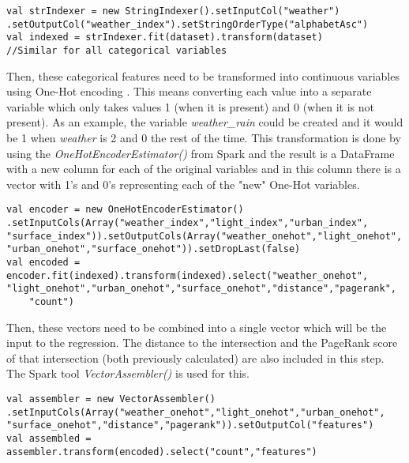 \begin{lstlisting}[style=myScalastyle]
val strIndexer = new StringIndexer().setInputCol("weather") .setOutputCol("weather_index").setStringOrderType("alphabetAsc") 
val indexed = strIndexer.fit(dataset).transform(dataset)
//Similar for all categorical variables
\end{lstlisting}
Then, these categorical features need to be transformed into continuous variables using One-Hot encoding \cite{onehot}. This means converting each value into a separate variable which only takes values 1 (when it is present) and 0 (when it is not present).
As an example, the variable \textit{weather\_rain} could be created and it would be 1 when \textit{weather} is 2 and 0 the rest of the time. This transformation is done by using the \textit{OneHotEncoderEstimator()} from Spark \cite{sparktransform} and the result is a DataFrame with a new column for each of the original variables and in this column there is a vector with 1's and 0's representing each of the "new" One-Hot variables.\\
\begin{lstlisting}[style=myScalastyle]
val encoder = new OneHotEncoderEstimator() .setInputCols(Array("weather_index","light_index","urban_index", "surface_index")).setOutputCols(Array("weather_onehot","light_onehot", "urban_onehot","surface_onehot")).setDropLast(false)
val encoded = encoder.fit(indexed).transform(indexed).select("weather_onehot", "light_onehot","urban_onehot","surface_onehot","distance","pagerank",
    "count")
\end{lstlisting}
Then, these vectors need to be combined into a single vector which will be the input to the regression. The distance to the intersection and the PageRank score of that intersection (both previously calculated) are also included in this step. The Spark tool \textit{VectorAssembler()} is used for this.\\
\begin{lstlisting}[style=myScalastyle]
val assembler = new VectorAssembler() .setInputCols(Array("weather_onehot","light_onehot","urban_onehot", "surface_onehot","distance","pagerank")).setOutputCol("features")
val assembled = assembler.transform(encoded).select("count","features")
\end{lstlisting}

